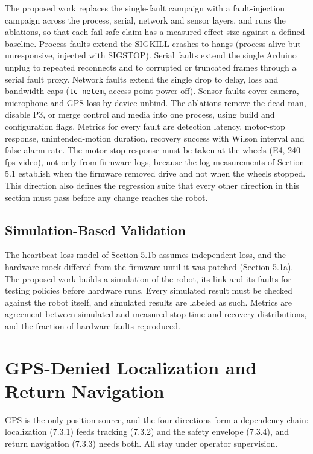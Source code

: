 The proposed work replaces the single-fault campaign with a fault-injection campaign across the process, serial, network and sensor layers, and runs the ablations, so that each fail-safe claim has a measured effect size against a defined baseline. Process faults extend the SIGKILL crashes to hangs (process alive but unresponsive, injected with SIGSTOP). Serial faults extend the single Arduino unplug to repeated reconnects and to corrupted or truncated frames through a serial fault proxy. Network faults extend the single drop to delay, loss and bandwidth caps (\texttt{tc netem}, access-point power-off). Sensor faults cover camera, microphone and GPS loss by device unbind. The ablations remove the dead-man, disable P3, or merge control and media into one process, using build and configuration flags. Metrics for every fault are detection latency, motor-stop response, unintended-motion duration, recovery success with Wilson interval and false-alarm rate. The motor-stop response must be taken at the wheels (E4, 240 fps video), not only from firmware logs, because the log measurements of Section 5.1 establish when the firmware removed drive and not when the wheels stopped. This direction also defines the regression suite that every other direction in this section must pass before any change reaches the robot.

\subsection{Simulation-Based Validation}

The heartbeat-loss model of Section 5.1b assumes independent loss, and the hardware mock differed from the firmware until it was patched (Section 5.1a). The proposed work builds a simulation of the robot, its link and its faults for testing policies before hardware runs. Every simulated result must be checked against the robot itself, and simulated results are labeled as such. Metrics are agreement between simulated and measured stop-time and recovery distributions, and the fraction of hardware faults reproduced.

\section{GPS-Denied Localization and Return Navigation}

GPS is the only position source, and the four directions form a dependency chain: localization (7.3.1) feeds tracking (7.3.2) and the safety envelope (7.3.4), and return navigation (7.3.3) needs both. All stay under operator supervision.

